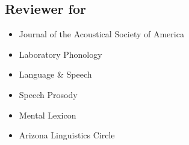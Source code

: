 \subsection*{Reviewer for}
\begin{itemize}
	\item[$\circ$] Journal of the Acoustical Society of America
	\item[$\circ$] Laboratory Phonology
	\item[$\circ$] Language \& Speech
	\item[$\circ$] Speech Prosody
	\item[$\circ$] Mental Lexicon
	\item[$\circ$] Arizona Linguistics Circle
\end{itemize}
